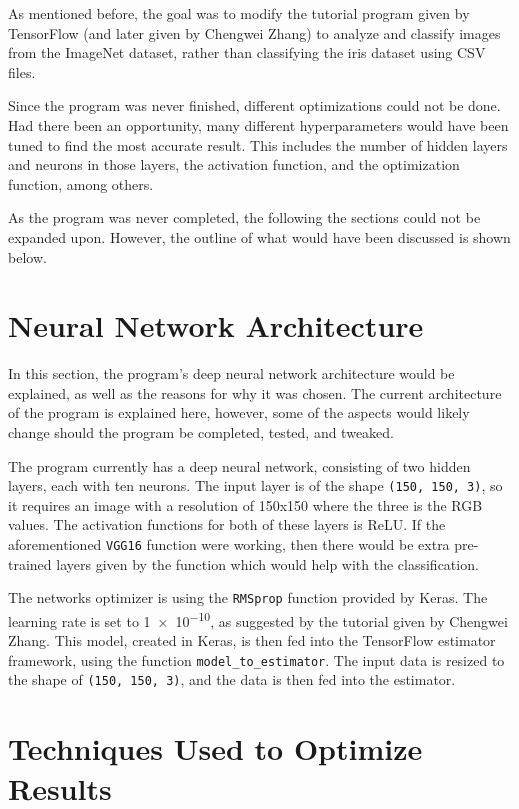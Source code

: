 \documentclass{article}
\begin{document}
As mentioned before, the goal was to modify the tutorial program
given by TensorFlow (and later given by Chengwei Zhang) to analyze
and classify images from the ImageNet dataset, rather than classifying
the iris dataset using CSV files.

Since the program was never finished, different optimizations could
not be done. Had there been an opportunity, many different hyperparameters
would have been tuned to find the most accurate result. This includes the
number of hidden layers and neurons in those layers, the activation function,
and the optimization function, among others.

As the program was never completed, the following the sections could not be
expanded upon. However, the outline of what would have been
discussed is shown below.

\section{Neural Network Architecture}

In this section, the program's deep neural network architecture would
be explained, as well as the reasons for why it was chosen. The current
architecture of the program is explained here, however, some of the aspects
would likely change should the program be completed, tested, and tweaked.

The program currently has a deep neural network, consisting of two hidden layers,
each with ten neurons. The input layer is of the shape \texttt{(150, 150, 3)}, so
it requires an image with a resolution of 150x150 where the three is the RGB values.
The activation functions for both of these layers is ReLU. If the aforementioned \texttt{VGG16} function were working, then there would be extra pre-trained 
layers given by the function which would help with the classification.

The networks optimizer is using the \texttt{RMSprop} function provided by
Keras. The learning rate is set to \num{1e-10}, as suggested by the
tutorial given by Chengwei Zhang. This model, created in Keras, is then
fed into the TensorFlow estimator framework, using the function
\texttt{model\_to\_estimator}. The input data is resized to the shape of
\texttt{(150, 150, 3)}, and the data is then fed into the estimator.

\section{Techniques Used to Optimize Results}
\end{document}
